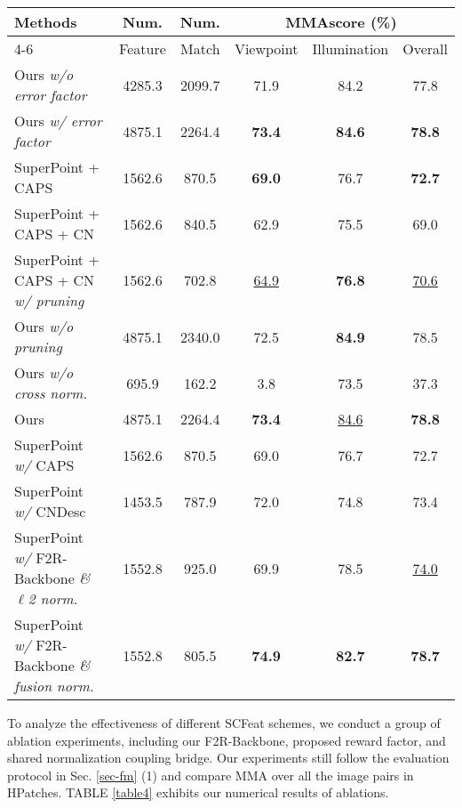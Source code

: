 \documentclass[journal]{IEEEtran}
\begin{document}
\begin{table*}[h]
\centering
\renewcommand\arraystretch{1.5}
\caption{Ablation Comparisons: the MMAscore results achieved by different combination schemes on HPatches \cite{HPatches}. }
{
\begin{tabular}{l|cc|ccc}
    \hline
     \multirow{2}{*}{Methods} & Num. & Num. & \multicolumn{3}{c}{MMAscore (\%)}\\
    \cline{4-6}
            & Feature & Match & Viewpoint & Illumination & Overall  \\
    \hline
    \hline
    Ours \textit{w/o error factor}          & 4285.3 & 2099.7 & 71.9 & 84.2 & 77.8  \\
    Ours \textit{w/ error factor}               & 4875.1 & 2264.4 & \textbf{73.4} & \textbf{84.6} & \textbf{78.8} \\
    \hline
    \hline
    SuperPoint + CAPS \cite{caps}     & 1562.6 & 870.5 & \textbf{69.0} & 76.7 & \textbf{72.7} \\
    SuperPoint + CAPS + CN              & 1562.6 & 840.5 & 62.9 & 75.5 & 69.0 \\
    \hdashline
    SuperPoint + CAPS + CN \textit{w/ pruning}  & 1562.6 & 702.8 & \underline{64.9} & \textbf{76.8} & \underline{70.6} \\
    \hline
    \hline
    Ours \textit{w/o pruning}       & 4875.1 & 2340.0 & 72.5 & \textbf{84.9} & 78.5 \\
    Ours \textit{w/o cross norm.}               & 695.9 & 162.2 & 3.8 & 73.5 & 37.3 \\
    \hdashline
    Ours    & 4875.1 & 2264.4 & \textbf{73.4} & \underline{84.6} & \textbf{78.8} \\
    \hline
    \hline
    SuperPoint \textit{w/} CAPS \cite{caps}       & 1562.6 & 870.5 & 69.0 & 76.7 & 72.7 \\
    SuperPoint \textit{w/} CNDesc \cite{cndesc}              & 1453.5 & 787.9 & 72.0 & 74.8 & 73.4 \\
    \hdashline
    SuperPoint \textit{w/} F2R-Backbone \textit{\& $\ell$2 norm.}  & 1552.8 & 925.0 & 69.9 & 78.5 & \underline{74.0} \\
    SuperPoint \textit{w/} F2R-Backbone \textit{\& fusion norm.}   & 1552.8 & 805.5 & \textbf{74.9} & \textbf{82.7} & \textbf{78.7} \\
    \hline
\end{tabular}
}
\label{table4}
\end{table*}

To analyze the effectiveness of different SCFeat schemes, we conduct a group of ablation experiments, including our F2R-Backbone, proposed reward factor, and shared normalization coupling bridge. Our experiments still follow the evaluation protocol in Sec. \ref{sec-fm} (1) and compare MMA over all the image pairs in HPatches. TABLE \ref{table4} exhibits our numerical results of ablations.
\end{document}
